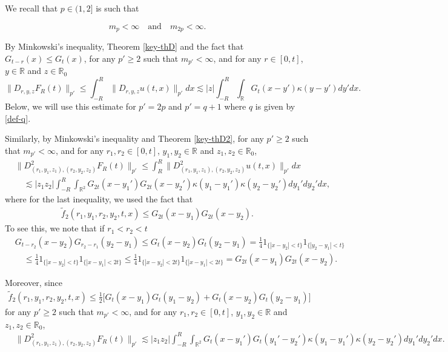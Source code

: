 \documentclass[12pt]{article}
\def\bR{\mathbb{R}}
\newcommand{\les}{\lesssim}
\def\k{\kappa}
\begin{document}
We recall that $p \in (1,2]$ is such that

\[
m_p<\infty \quad \mbox{and} \quad m_{2p}<\infty.
\]

By Minkowski's inequality, Theorem \ref{key-thD} and the fact that $G_{t-r}(x)\leq G_t(x)$, for any $p'\geq 2$ such that $m_{p'}<\infty$, and for any $r \in [0,t]$, $y \in \bR$ and $z\in \bR_0$
\begin{equation}
\label{Du}
\|D_{r,y,z}F_R(t)\|_{p'} \leq \int_{-R}^R \|D_{r,y,z}u(t,x)\|_{p'}dx \les |z|
\int_{-R}^{R}\int_{\bR}G_{t}(x-y')\k(y-y')dy'dx. %
\end{equation}
Below, we will use this estimate for $p'=2p$ and $p'=q+1$ where $q$ is given by \eqref{def-q}.

\medskip

Similarly, by Minkowski's inequality and Theorem \ref{key-thD2}, for any $p'\geq 2$ such that $m_{p'}<\infty$, and for any $r_1,r_2 \in [0,t]$, $y_1,y_2 \in \bR$ and $z_1,z_2 \in \bR_0$,
\begin{align}
\nonumber
& \|D_{(r_1,y_1,z_1),(r_2,y_2,z_2)}^2 F_R(t)\|_{p'} \leq \int_{R}^{R}\|D_{(r_1,y_1,z_1),(r_2,y_2,z_2)}^2u(t,x)\|_{p'}dx \\
\label{D2u}
& \quad \les |z_1 z_2|
\int_{-R}^R \int_{\bR^2}G_{2t}(x-y_1')G_{2t}(x-y_2')\k(y_1-y_1')\k(y_2-y_2')dy_1'dy_2'dx,
\end{align}
where for the last inequality, we used the fact that
\begin{align*}
\widetilde{f}_2(r_1,y_1,r_2,y_2,t,x) \leq G_{2t}(x-y_1)G_{2t}(x-y_2).
\end{align*}
To see this, we note that if $r_1<r_2<t$
\begin{align*}
& G_{t-r_2}(x-y_2)G_{r_2-r_1}(y_2-y_1)  \leq G_{t}(x-y_2)G_{t}(y_2-y_1)=\frac{1}{4}1_{\{|x-y_2|<t\}} 1_{\{|y_2-y_1|<t\}}\\
& \quad \leq \frac{1}{4} 1_{\{|x-y_2|<t\}} 1_{\{|x-y_1|<2t\}} \leq \frac{1}{4} 1_{\{|x-y_2|<2t\}} 1_{\{|x-y_1|<2t\}}=G_{2t}(x-y_1)G_{2t}(x-y_2).
\end{align*}


Moreover, since
\begin{align*}
\widetilde{f}_2(r_1,y_1,r_2,y_2,t,x) \leq \frac{1}{2} \big[G_{t}(x-y_1)G_{t}(y_1-y_2)+
G_{t}(x-y_2)G_{t}(y_2-y_1)\big]
\end{align*}
for any $p'\geq 2$ such that $m_{p'}<\infty$, and for any $r_1,r_2 \in [0,t]$, $y_1,y_2 \in \bR$ and $z_1,z_2 \in \bR_0$,
\begin{align}
\label{D2u-1}
& \|D_{(r_1,y_1,z_1),(r_2,y_2,z_2)}^2 F_R(t)\|_{p'}  \les |z_1 z_2|
\int_{-R}^R \int_{\bR^2}G_{t}(x-y_1')G_{t}(y_1'-y_2')\k(y_1-y_1')\k(y_2-y_2')dy_1'dy_2'dx.
\end{align}
\end{document}
